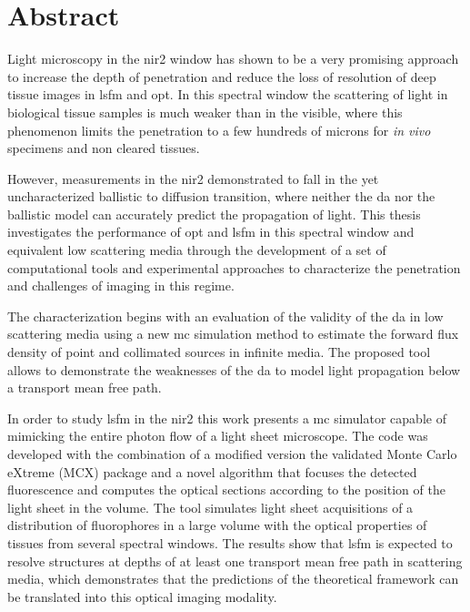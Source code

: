 \chapter*{Abstract}
Light microscopy in the \acrfull{nir2} window has shown to be a very promising approach to increase the depth of penetration and reduce the loss of resolution of deep tissue images in \acrfull{lsfm} and \acrfull{opt}.
In this spectral window the scattering of light in biological tissue samples is much weaker than in the visible, where this phenomenon limits the penetration to a few hundreds of microns for \textit{in vivo} specimens and non cleared tissues.

However, measurements in the \gls{nir2} demonstrated to fall in the yet uncharacterized ballistic to diffusion transition, where neither the \acrfull{da} nor the ballistic model can accurately predict the propagation of light. This thesis investigates the performance of \gls{opt} and \gls{lsfm} in this spectral window and equivalent low scattering media through the development of a set of computational tools and experimental approaches to characterize the penetration and challenges of imaging in this regime. 

The characterization begins with an evaluation of the validity of the \gls{da} in low scattering media using a new \acrfull{mc} simulation method to estimate the forward flux density of point and collimated sources in infinite media. The proposed tool allows to demonstrate the weaknesses of the \gls{da} to model light propagation below a transport mean free path.

In order to study \gls{lsfm} in the \gls{nir2} this work presents a \gls{mc} simulator capable of mimicking the entire photon flow of a light sheet microscope. The code was developed with the combination of a modified version the validated Monte Carlo eXtreme (MCX) package and a novel algorithm that focuses the detected fluorescence and computes the optical sections according to the position of the light sheet in the volume. The tool simulates light sheet acquisitions of a distribution of fluorophores in a large volume with the optical properties of tissues from several spectral windows. The results show that \gls{lsfm} is expected to resolve structures at depths of at least one transport mean free path in scattering media, which demonstrates that the predictions of the theoretical framework can be translated into this optical imaging modality. 

